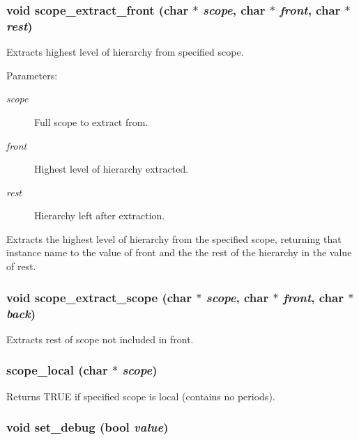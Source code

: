 \subsubsection{\setlength{\rightskip}{0pt plus 5cm}void scope\_\-extract\_\-front (char $\ast$ {\em scope}, char $\ast$ {\em front}, char $\ast$ {\em rest})}\label{util_8c_a14}


Extracts highest level of hierarchy from specified scope.

\begin{Desc}
\item[Parameters:]
\begin{description}
\item[{\em scope}]Full scope to extract from. \item[{\em front}]Highest level of hierarchy extracted. \item[{\em rest}]Hierarchy left after extraction.\end{description}
\end{Desc}
Extracts the highest level of hierarchy from the specified scope, returning that instance name to the value of front and the the rest of the hierarchy in the value of rest. 
\subsubsection{\setlength{\rightskip}{0pt plus 5cm}void scope\_\-extract\_\-scope (char $\ast$ {\em scope}, char $\ast$ {\em front}, char $\ast$ {\em back})}\label{util_8c_a16}


Extracts rest of scope not included in front.

\subsubsection{ scope\_\-local (char $\ast$ {\em scope})}\label{util_8c_a17}


Returns TRUE if specified scope is local (contains no periods).

\subsubsection{\setlength{\rightskip}{0pt plus 5cm}void set\_\-debug ({\bf bool} {\em value})}\label{util_8c_a6}


